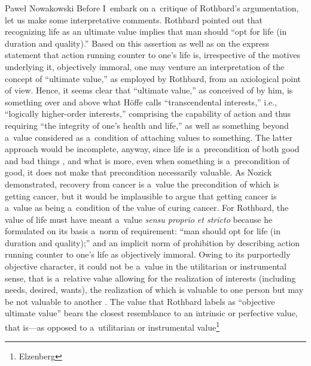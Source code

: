 \begin{artengenv}{Paweł Nowakowski}
Before I~embark on a~critique of Rothbard's argumentation, let us make some interpretative comments. Rothbard pointed out that recognizing life as an ultimate value implies that man should ``opt for life (in duration and quality).'' Based on this assertion as well as on the express statement that action running counter to one's life is, irrespective of the motives underlying it, objectively immoral, one may venture an interpretation of the concept of ``ultimate value,'' as employed by Rothbard, from an axiological point of view. Hence, it seems clear that ``ultimate value,'' as conceived of by him, is something over and above what Höffe 
\parencite*[][pp.26–27]{Höffe1991Gerechtigkeit} %
 calls ``transcendental interests,'' i.e., ``logically higher-order interests,'' comprising the capability of action and thus requiring ``the integrity of one's health and life,'' as well as something beyond a~value considered as a~condition of attaching values to something. The latter approach would be incomplete, anyway, since life is a~precondition of both good and bad things 
\parencite[][p.8]{Raz2001Value}, %
 and what is more, even when something is a~precondition of good, it does not make that precondition necessarily valuable. As Nozick 
\parencite*[][p.252]{Nozick1971On} %
 demonstrated, recovery from cancer is a~value the precondition of which is getting cancer, but it would be implausible to argue that getting cancer is a~value as being a~condition of the value of curing cancer. For Rothbard, the value of life must have meant a~value \textit{sensu proprio et stricto} because he formulated on its basis a~norm of requirement: ``man should opt for life (in duration and quality);'' and an implicit norm of prohibition by describing action running counter to one's life as objectively immoral. Owing to its purportedly objective character, it could not be a~value in the utilitarian or instrumental sense, that is a~relative value allowing for the realization of interests (including needs, desired, wants), the realization of which is valuable to one person but may be not valuable to another 
\parencites[see][p.21]{Elzenberg1990Wartość}[][p.77]{Raz2001Value}. %
 The value that Rothbard labels as ``objective ultimate value'' bears the closest resemblance to an intrinsic or perfective value, that is---as opposed to a~utilitarian or instrumental value\footnote{Elzenberg 
}
\end{artengenv}

